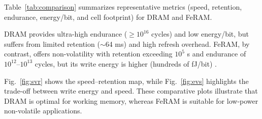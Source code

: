 Table~\ref{tab:comparison} summarizes representative metrics (speed, retention, endurance, energy/bit, and cell footprint) for DRAM and FeRAM. 

DRAM provides ultra-high endurance ($\geq 10^{16}$ cycles) and low energy/bit, but suffers from limited retention ($\sim$64 ms) and high refresh overhead. FeRAM, by contrast, offers non-volatility with retention exceeding $10^5$ s and endurance of $10^{12}$--$10^{13}$ cycles, but its write energy is higher (hundreds of fJ/bit) \cite{noheda2023,martin2020}. 

Fig.~\ref{fig:svr} shows the speed–retention map, while Fig.~\ref{fig:evs} highlights the trade-off between write energy and speed. These comparative plots illustrate that DRAM is optimal for working memory, whereas FeRAM is suitable for low-power non-volatile applications.
